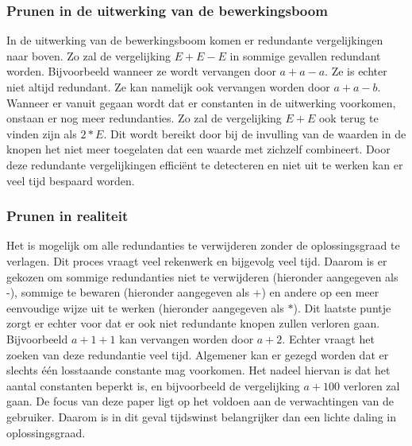 \documentclass[Main.tex]{subfiles}
\begin{document}
\subsubsection*{Prunen in de uitwerking van de bewerkingsboom}
In de uitwerking van de bewerkingsboom komen er redundante vergelijkingen naar boven. Zo zal de vergelijking $E+E-E$ in sommige gevallen redundant worden. Bijvoorbeeld wanneer ze wordt vervangen door $a+a-a$. Ze is echter niet altijd redundant. Ze kan namelijk ook vervangen worden door $a+a-b$. Wanneer er vanuit gegaan wordt dat er constanten in de uitwerking voorkomen, onstaan er nog meer redundanties. Zo zal de vergelijking $E+E$ ook terug te vinden zijn als $2*E$. Dit wordt bereikt door bij de invulling van de waarden in de knopen het niet meer toegelaten dat een waarde met zichzelf combineert. Door deze redundante vergelijkingen effici\"ent te detecteren en niet uit te werken kan er veel tijd bespaard worden.

\subsubsection*{Prunen in realiteit}
Het is mogelijk om alle redundanties te verwijderen zonder de oplossingsgraad te verlagen. Dit proces vraagt veel rekenwerk en bijgevolg veel tijd. Daarom is er gekozen om sommige redundanties niet te verwijderen (hieronder aangegeven als -), sommige te bewaren (hieronder aangegeven als +) en andere op  een meer eenvoudige wijze uit te werken (hieronder aangegeven als $\ast$). Dit laatste puntje zorgt er echter voor dat er ook niet redundante knopen zullen verloren gaan. Bijvoorbeeld $a+1+1$ kan vervangen worden door $a+2$. Echter vraagt het zoeken van deze redundantie veel tijd. Algemener kan er gezegd worden dat er slechts \'e\'en losstaande constante mag voorkomen. Het nadeel hiervan is dat het aantal constanten beperkt is, en bijvoorbeeld de vergelijking $a+100$ verloren zal gaan. De focus van deze paper ligt op het voldoen aan de verwachtingen van de gebruiker. Daarom is in dit geval tijdswinst belangrijker dan een lichte daling in oplossingsgraad. 
\end{document}

